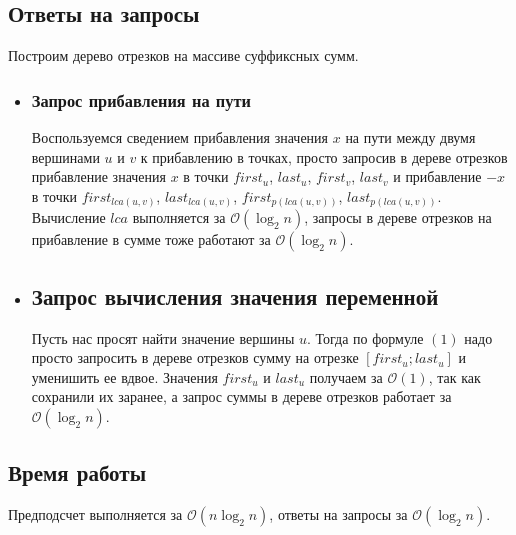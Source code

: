\documentclass{article}
\begin{document}
\subsection*{Ответы на запросы}
Построим дерево отрезков на массиве суффиксных сумм.
\begin{itemize}
	\item[\RomanNumeralCaps{1}]
	\subsubsection*{Запрос прибавления на пути} 
	Воспользуемся сведением прибавления значения $x$ на пути между двумя вершинами $u$ и $v$ к прибавлению в точках, просто запросив в дереве отрезков прибавление значения $x$ в точки $first_u$, $last_u$, $first_v$, $last_v$ и прибавление $-x$ в точки $first_{lca(u, v)}$, $last_{lca(u, v)}$, $first_{p(lca(u, v))}$, $last_{p(lca(u, v))}$.
	Вычисление $lca$ выполняется за $\mathcal{O}(\log_2{n})$, запросы в дереве отрезков на прибавление в сумме тоже работают за $\mathcal{O}(\log_2{n})$. 
	\item[\RomanNumeralCaps{2}]
	\subsection*{Запрос вычисления значения переменной}
	Пусть нас просят найти значение вершины $u$. Тогда по формуле $(1)$ надо просто запросить в дереве отрезков сумму на отрезке $[first_u; last_u]$ и уменишить ее вдвое. Значения $first_u$ и $last_u$ получаем за $\mathcal{O}(1)$, так как сохранили их заранее, а запрос суммы в дереве отрезков работает за $\mathcal{O}(\log_2{n})$. 

\end{itemize}
\subsection*{Время работы}
Предподсчет выполняется за $\mathcal{O}(n\log_2{n})$, ответы на запросы за $\mathcal{O}(\log_2{n})$.
\end{document}
